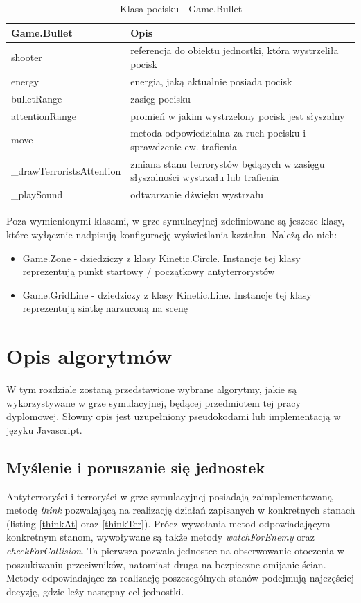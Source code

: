 \begin{table}
\begin{center}
\begin{tabular}{|p{}|p{}|}
\hline
\textbf{Game.Bullet} & Opis\\\hline		
	shooter & referencja do obiektu jednostki,  która wystrzeliła pocisk\\
	energy & energia, jaką aktualnie posiada pocisk\\
	bulletRange & zasięg pocisku\\	
	attentionRange & promień w jakim wystrzelony pocisk jest słyszalny
\\\hline
	move & metoda odpowiedzialna za ruch pocisku i sprawdzenie ew. trafienia\\
	\_drawTerroristsAttention & zmiana stanu terrorystów będących w zasięgu słyszalności wystrzału lub trafienia\\
	\_playSound & odtwarzanie dźwięku wystrzału
\\\hline
\end{tabular}
\caption {Klasa pocisku - Game.Bullet\label{objectsGameBullet}}
\end{center}
\end{table} 
\clearpage
Poza wymienionymi klasami, w grze symulacyjnej zdefiniowane są jeszcze klasy, które wyłącznie nadpisują konfigurację wyświetlania kształtu. Należą do nich:
\begin{itemize}
	\item Game.Zone - dziedziczy z klasy Kinetic.Circle. Instancje tej klasy reprezentują punkt startowy / początkowy antyterrorystów
	\item Game.GridLine - dziedziczy z klasy Kinetic.Line. Instancje tej klasy reprezentują siatkę narzuconą na scenę
\end{itemize}

\section{Opis algorytmów}
W tym rozdziale zostaną przedstawione wybrane algorytmy, jakie są wykorzystywane w grze symulacyjnej, będącej przedmiotem tej pracy dyplomowej. Słowny opis jest uzupełniony pseudokodami lub implementacją w języku Javascript.

\subsection{Myślenie i poruszanie się jednostek}
Antyterroryści i terroryści w grze symulacyjnej posiadają zaimplementowaną metodę \emph{think} pozwalającą na realizację działań zapisanych w konkretnych stanach (listing \ref{thinkAt} oraz \ref{thinkTer}). Prócz wywołania metod odpowiadającym konkretnym stanom, wywoływane są także metody \emph{watchForEnemy} oraz \emph{checkForCollision}. Ta pierwsza pozwala jednostce na obserwowanie otoczenia w poszukiwaniu przeciwników, natomiast druga na bezpieczne omijanie ścian. Metody odpowiadające za realizację poszczególnych stanów podejmują najczęściej decyzję, gdzie leży następny cel jednostki.

